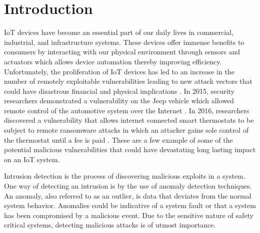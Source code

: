 \section{Introduction}

IoT devices have become an essential part of our daily lives in commercial, industrial, and infrastructure systems. These devices offer immense benefits to consumers by interacting with our physical environment through sensors and actuators which allows device automation thereby improving efficiency. Unfortunately, the proliferation of IoT devices has led to an increase in the number of remotely exploitable vulnerabilities leading to new attack vectors that could have disastrous financial and physical implications \cite{barcena2015insecurity}. In 2015, security researchers demonstrated a vulnerability on the Jeep vehicle which allowed remote control of the automotive system over the Internet \cite{jeep_vulnerabilty}. In 2016, researchers discovered a vulnerability that allows internet connected smart thermostats to be subject to remote ransomware attacks in which an attacker gains sole control of the thermostat until a fee is paid \cite{smart_thermostat}. These are a few example of some of the potential malicious vulnerabilities that could have devastating long lasting impact on an IoT system. \par Intrusion detection \cite{Lazarevic2005} is the process of discovering malicious exploits in a system. One way of detecting an intrusion is by the use of anomaly detection techniques. An anomaly, also referred to as an outlier, is data that deviates from the normal system behavior. Anomalies could be indicative of a system fault or that a system has been compromised by a malicious event. Due to the sensitive nature of safety critical systems, detecting malicious attacks is of utmost importance.

 



